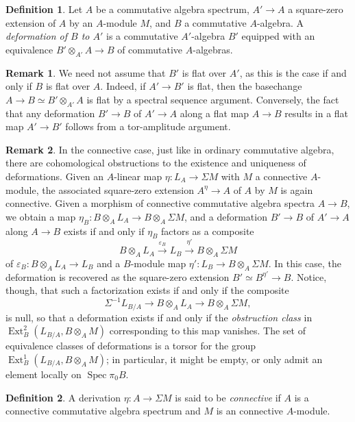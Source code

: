 \documentclass{article}
\theoremstyle{definition}
\newtheorem{definition}{Definition}[subsection]
\newtheorem{remark}{Remark}[subsection]
\newcommand{\too}{\longrightarrow}
\DeclareMathOperator{\Ext}{Ext}
\DeclareMathOperator{\Spec}{Spec}
\renewcommand{\epsilon}{\varepsilon}
\begin{document}
\begin{definition}
Let $A$ be a commutative algebra spectrum, $A'\to A$
a square-zero extension of $A$ by an $A$-module $M$, and $B$ a commutative $A$-algebra.
A {\em deformation of $B$ to $A' $}
is a commutative $A'$-algebra $B'$ equipped with an equivalence
$B'\otimes_{A'} A\to B$ of commutative $A$-algebras.
\end{definition}
\begin{remark}
We need not assume that $B'$ is flat over $A'$, as this is the case if and only if $B$ is flat over $A$.
Indeed, if $A'\to B'$ is flat, then the basechange $A\to B\simeq B'\otimes_{A'} A$ is flat by a spectral sequence argument.
Conversely, the fact that any deformation $B'\to B$ of $A'\to A$ along a flat map $A\to B$ results in a flat map $A'\to B'$ follows from a tor-amplitude argument.
\end{remark}
\begin{remark}
In the connective case, just like in ordinary commutative algebra, there are cohomological obstructions to the existence and uniqueness of deformations.
Given an $A$-linear map $\eta:L_A\to\Sigma M$ with $M$ a connective $A$-module, the associated square-zero extension $A^\eta\to A$ of $A$ by $M$ is again connective.
Given a morphism of connective commutative algebra spectra $A\to B$, we obtain a map $\eta_B:B\otimes_A L_A\to B\otimes_A\Sigma M$, and a deformation $B'\to B$ of $A'\to A$ along $A\to B$ exists if and only if $\eta_B$ factors as a composite
\[
B\otimes_A L_A\overset{\epsilon_B}{\too} L_B\overset{\eta'}{\too} B\otimes_A\Sigma M
\]
of $\epsilon_B:B\otimes_A L_A\to L_B$ and a $B$-module map $\eta':L_B\to B\otimes_A\Sigma M$.
In this case, the deformation is recovered as the square-zero extension $B'\simeq B^{\eta'}\to B$.
Notice, though, that such a factorization exists if and only if the composite
\[
\Sigma^{-1}L_{B/A}\too B\otimes_A L_A\too B\otimes_A\Sigma M,
\]
is null, so that a deformation exists if and only if the {\em obstruction class} in $\Ext^2_B(L_{B/A}, B\otimes_A M)$ corresponding to this map vanishes.
The set of equivalence classes of deformations is a torsor for the group $\Ext^1_B(L_{B/A}, B\otimes_A M)$; in particular, it might be empty, or only admit an element locally on $\Spec\pi_0 B$.
\end{remark}
\begin{definition}
A derivation $\eta:A\to\Sigma M$ is said to be {\em connective} if $A$ is a connective commutative algebra spectrum and $M$ is an connective $A$-module.
\end{definition}
\end{document}
